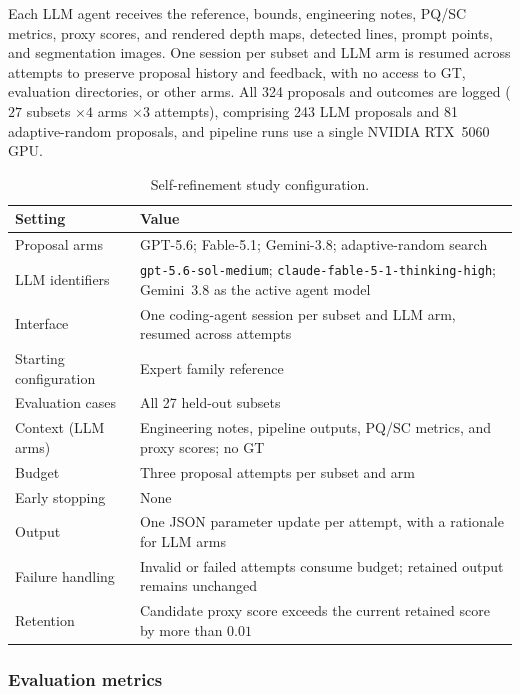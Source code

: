 \documentclass[a4paper,fleqn]{cas-dc}
\begin{document}
Each LLM agent receives the reference, bounds, engineering notes, PQ/SC metrics, proxy scores, and rendered depth maps, detected lines, prompt points, and segmentation images. One session per subset and LLM arm is resumed across attempts to preserve proposal history and feedback, with no access to GT, evaluation directories, or other arms. All 324 proposals and outcomes are logged ($27$ subsets $\times 4$ arms $\times 3$ attempts), comprising 243 LLM proposals and 81 adaptive-random proposals, and pipeline runs use a single NVIDIA RTX~5060 GPU.

\begin{table}[ht]
\caption{Self-refinement study configuration.}
\label{tab:poc-config}
\centering
\begin{tabular}{p{} p{}}
\toprule
Setting & Value \\
\midrule
Proposal arms & GPT-5.6; Fable-5.1; Gemini-3.8; adaptive-random search \\
LLM identifiers & \texttt{gpt-5.6-sol-medium}; \texttt{claude-fable-5-1-thinking-high}; Gemini~3.8 as the active agent model \\
Interface & One coding-agent session per subset and LLM arm, resumed across attempts \\
Starting configuration & Expert family reference \\
Evaluation cases & All 27 held-out subsets \\
Context (LLM arms) & Engineering notes, pipeline outputs, PQ/SC metrics, and proxy scores; no GT \\
Budget & Three proposal attempts per subset and arm \\
Early stopping & None \\
Output & One JSON parameter update per attempt, with a rationale for LLM arms \\
Failure handling & Invalid or failed attempts consume budget; retained output remains unchanged \\
Retention & Candidate proxy score exceeds the current retained score by more than $0.01$ \\
\bottomrule
\end{tabular}
\end{table}


\subsubsection{Evaluation metrics}
\label{sec:metrics}
\end{document}
